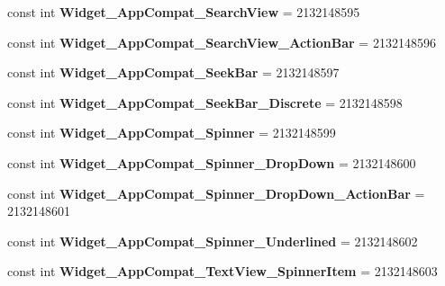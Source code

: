 \begin{DoxyCompactItemize}
const int {\bfseries Widget\+\_\+\+App\+Compat\+\_\+\+Search\+View} = 2132148595
\item 
\mbox{\label{classst_delivery_1_1_resource_1_1_style_ad7eac53094f69a145b324a9650b9773f}} 
const int {\bfseries Widget\+\_\+\+App\+Compat\+\_\+\+Search\+View\+\_\+\+Action\+Bar} = 2132148596
\item 
\mbox{\label{classst_delivery_1_1_resource_1_1_style_a74279fcab251ab7c3c00dce1dee15309}} 
const int {\bfseries Widget\+\_\+\+App\+Compat\+\_\+\+Seek\+Bar} = 2132148597
\item 
\mbox{\label{classst_delivery_1_1_resource_1_1_style_ae37cb0ed43df49ca0c1c7858851d493e}} 
const int {\bfseries Widget\+\_\+\+App\+Compat\+\_\+\+Seek\+Bar\+\_\+\+Discrete} = 2132148598
\item 
\mbox{\label{classst_delivery_1_1_resource_1_1_style_a6a5d0e3316e1ff430f8848d6a7c95100}} 
const int {\bfseries Widget\+\_\+\+App\+Compat\+\_\+\+Spinner} = 2132148599
\item 
\mbox{\label{classst_delivery_1_1_resource_1_1_style_a6432bfbf364364ad1ed3d1e74ab16e38}} 
const int {\bfseries Widget\+\_\+\+App\+Compat\+\_\+\+Spinner\+\_\+\+Drop\+Down} = 2132148600
\item 
\mbox{\label{classst_delivery_1_1_resource_1_1_style_a1a235030424bc79f2f73985b0ba5a9db}} 
const int {\bfseries Widget\+\_\+\+App\+Compat\+\_\+\+Spinner\+\_\+\+Drop\+Down\+\_\+\+Action\+Bar} = 2132148601
\item 
\mbox{\label{classst_delivery_1_1_resource_1_1_style_a3ef16d7e3387c016fe43a212e5c8334c}} 
const int {\bfseries Widget\+\_\+\+App\+Compat\+\_\+\+Spinner\+\_\+\+Underlined} = 2132148602
\item 
\mbox{\label{classst_delivery_1_1_resource_1_1_style_a3169e6b418da4a0eccbafc4207c6edf2}} 
const int {\bfseries Widget\+\_\+\+App\+Compat\+\_\+\+Text\+View\+\_\+\+Spinner\+Item} = 2132148603

\end{DoxyCompactItemize}

